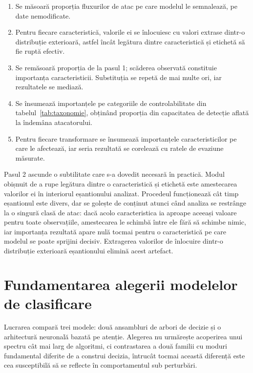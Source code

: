 \begin{algorithm}[!ht]
\caption{Determinarea importanței și corelarea cu evaziunea}\label{alg:sensibilitate}
\begin{enumerate}\itemsep2pt
    \item Se măsoară proporția fluxurilor de atac pe care modelul le semnalează, pe date nemodificate.
    \item Pentru fiecare caracteristică, valorile ei se înlocuiesc cu valori extrase dintr-o distribuție exterioară, astfel încât legătura dintre caracteristică și etichetă să fie ruptă efectiv.
    \item Se remăsoară proporția de la pasul 1; scăderea observată constituie importanța caracteristicii. Substituția se repetă de mai multe ori, iar rezultatele se mediază.
    \item Se însumează importanțele pe categoriile de controlabilitate din tabelul~\ref{tab:taxonomie}, obținând proporția din capacitatea de detecție aflată la îndemâna atacatorului.
    \item Pentru fiecare transformare se însumează importanțele caracteristicilor pe care le afectează, iar seria rezultată se corelează cu ratele de evaziune măsurate.
\end{enumerate}
\end{algorithm}

Pasul 2 ascunde o subtilitate care s-a dovedit necesară în practică. Modul obișnuit de a rupe legătura dintre o caracteristică și etichetă este amestecarea valorilor ei în interiorul eșantionului analizat. Procedeul funcționează cât timp eșantionul este divers, dar se golește de conținut atunci când analiza se restrânge la o singură clasă de atac: dacă acolo caracteristica ia aproape aceeași valoare pentru toate observațiile, amestecarea le schimbă între ele fără să schimbe nimic, iar importanța rezultată apare nulă tocmai pentru o caracteristică pe care modelul se poate sprijini decisiv. Extragerea valorilor de înlocuire dintr-o distribuție exterioară eșantionului elimină acest artefact.

\section{Fundamentarea alegerii modelelor de clasificare}\label{sec:alegerea-modelelor}

Lucrarea compară trei modele: două ansambluri de arbori de decizie și o arhitectură neuronală bazată pe atenție. Alegerea nu urmărește acoperirea unui spectru cât mai larg de algoritmi, ci contrastarea a două familii cu moduri fundamental diferite de a construi decizia, întrucât tocmai această diferență este cea susceptibilă să se reflecte în comportamentul sub perturbări.

